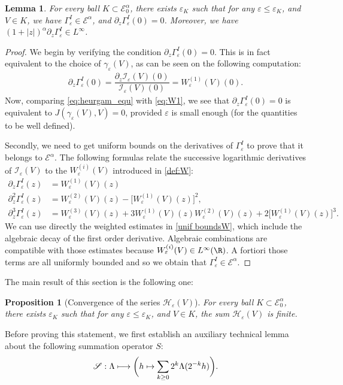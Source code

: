 \documentclass[10pt]{amsart}
\let\mathcal\mathscr
\def\mto{\mathchoice{\longmapsto}{\mapsto}{\mapsto}{\mapsto}}
\newcommand{\cI}{\mathcal{I}}
\newcommand{\cS}{\mathcal{S}}
\theoremstyle{plain}
\newtheorem{lem}[thm]{Lemma}
\newtheorem{prop}[thm]{Proposition}
\theoremstyle{definition}
\renewcommand{\H}{\mathcal{H}_\eps}
\let\eps\varepsilon
\newcommand{\Ea}{\mathcal{E}^\alpha}
\newcommand{\Eaz}{\mathcal{E}^\alpha_0}
\newcommand{\GammaI}{\Gamma^I_{\eps}}
\begin{document}
\begin{lem}\label{cond log Ieps Eaz}
For every ball $K\subset \Eaz$, there exists $\eps_K$ such that for any $\eps \leq \eps_K$, and $V\in K$, we have $\GammaI\in \Ea$, and $\partial_z \GammaI (0) = 0$. Moreover, we have $(1+|z|)^\alpha\partial_z \GammaI \in L^\infty$.
\end{lem}
\begin{proof}
We begin by verifying the condition $\partial_z \GammaI (0) = 0$. This is in fact equivalent to the choice of $\gamma_\eps(V)$, as can be seen on the following computation:
\begin{align*}
\partial_z \GammaI(0)= \dfrac{\partial_z \cI_\eps(V)(0)}{\cI_\eps(V)(0)} = W_\eps^{(1)}(V)(0).
\end{align*}
Now, comparing \eqref{eq:heurgam_equ} with \eqref{eq:W1}, we see that $\partial_z \GammaI(0) = 0$ is equivalent to $J(\gamma_\eps(V),V) = 0$, provided $\eps$ is small enough (for the quantities to be well defined).

Secondly, we need to get uniform bounds on the derivatives of $\GammaI$ to prove that it belongs to $\Ea$. The following formulas relate the successive logarithmic derivatives of $\cI_\eps(V)$ to the $W_\eps^{(i)}(V)$ introduced in \cref{def:W}:
\begin{align}
\partial_z \GammaI(z) & = W_\eps^{(1)}(V)(z) \label{eq:pz gammaI}\\
\partial_z^2 \GammaI(z) & = W_\eps^{(2)}(V)(z) - \bigl [W_\eps^{(1)}(V)(z) \bigr ]^2, \label{eq:pz2 gammaI}\\
\partial_z^3 \GammaI(z) & = W_\eps^{(3)}(V)(z) + 3W_\eps^{(1)}(V)(z)W_\eps^{(2)}(V)(z) +2 \bigl [W_\eps^{(1)}(V)(z) \bigr ]^3. \label{eq:pz3 gammaI}
\end{align}
We can use directly the weighted estimates in \cref{unif boundsW}, which include the algebraic decay of the first order derivative. Algebraic combinations are compatible with those estimates because $W_\eps^{(i)}(V) \in L^\infty(\R)$.
A fortiori those terms are all uniformly bounded and so we obtain that $\GammaI\in \Ea$.
\end{proof}

The main result of this section is the following one:
\begin{prop}[Convergence of the series $\H(V)$]\label{finiteness Heps}
For every ball $K\subset \Eaz$, there exists $\eps_K$ such that for any $\eps \leq \eps_K$, and $V\in K$, the sum $\H(V)$ is finite.
\end{prop}
Before proving this statement, we first establish an auxiliary technical lemma about the following summation operator $S$:
\begin{equation*}
\cS: \Lambda \mto \biggl(h \mapsto \sum_{k \geq 0} 2^k \Lambda	 (2^{-k}h) \biggr).
\end{equation*}
\end{document}
